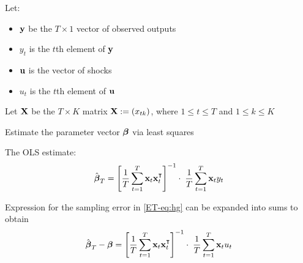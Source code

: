 \begin{frame}

    \vspace{2em}
    Let:
    \begin{itemize}
        \item ${\mathbf y}$ be the $T \times 1$ vector of observed outputs
        \item $y_t$ is the $t$th element of ${\mathbf y}$
        \item ${\mathbf u}$ is the vector of shocks
        \item $u_t$ is the $t$th element of
                ${\mathbf u}$
    \end{itemize}

    \vspace{.7em}
    Let $\mathbf X$ be the $T \times K$ matrix
    $\mathbf X := (x_{tk})$, where $1 \leq t \leq T$ and $1 \leq k \leq K$
    
    \vspace{.7em}
    Estimate the parameter vector ${\boldsymbol \beta}$ via least squares

\end{frame}

\begin{frame}

    \vspace{2em}
    The OLS estimate:
    \begin{equation*}
        \hboldbeta_T 
        = \left[ \frac{1}{T} \sum_{t=1}^T \boldx_t \boldx_t^\T \right]^{-1} 
                \cdot \; \frac{1}{T} \sum_{t=1}^T \boldx_t y_t
    \end{equation*}
    
    \vspace{.7em}
    Expression for the sampling error in \eqref{ET-eq:hg} can be
    expanded into sums to obtain
    \begin{equation}
        \label{eq:seeo}
        \hboldbeta_T - \boldbeta 
        = \left[ \frac{1}{T} \sum_{t=1}^T \boldx_t \boldx_t^\T \right]^{-1} 
            \cdot \; \frac{1}{T} \sum_{t=1}^T \boldx_t u_t
    \end{equation}
    
\end{frame}

